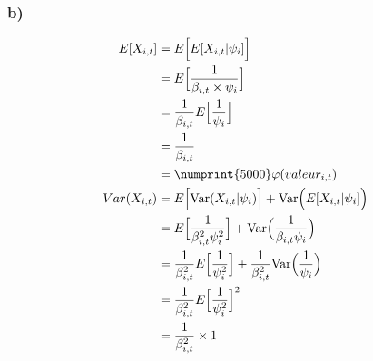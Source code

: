 \subsubsection*{b)}
\begin{align*}
E[X_{i,t}] &= E \Big[E[X_{i,t}|\psi_i]  \Big] \\
&= E \Big[\frac{1}{\beta_{i,t} \times \psi_i} \Big] \\
&=\frac{1}{\beta_{i,t}} E \Big[\frac{1}{\psi_i} \Big] \\
&= \frac{1}{\beta_{i,t}}\\
&=\numprint{5000} \varphi(valeur_{i,t})\\                                                                                                                                                                                                     Var(X_{i,t}) &= E \Big[\text{Var}(X_{i,t}|\psi_i) \Big] + \text{Var}\Big( E[X_{i,t}|\psi_i]  \Big) \\
&= E \Big[\frac{1}{\beta_{i,t}^2 \psi_i^2}\Big] + \text{Var}\Big(\frac{1}{\beta_{i,t} \psi_i} \Big) \\
&= \frac{1}{\beta_{i,t}^2} E \Big[\frac{1}{\psi_i^2}\Big] + \frac{1}{\beta_{i,t}^2} \text{Var}\Big(\frac{1}{\psi_i} \Big) \\
&= \frac{1}{\beta_{i,t}^2} E \Big[\frac{1}{\psi_i^2}\Big]^2 \\
&= \frac{1}{\beta_{i,t}^2} \times 1\\
\end{align*}
